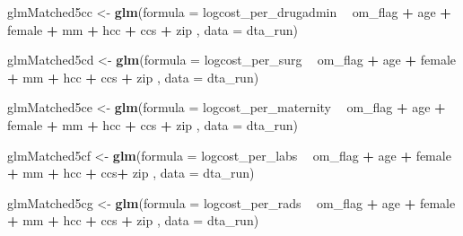 \documentclass[]{article}
\newenvironment{Shaded}{\begin{snugshade}}{\end{snugshade}}
\newcommand{\KeywordTok}[1]{\textcolor[rgb]{0.13,0.29,0.53}{\textbf{#1}}}
\newcommand{\DataTypeTok}[1]{\textcolor[rgb]{0.13,0.29,0.53}{#1}}
\newcommand{\StringTok}[1]{\textcolor[rgb]{0.31,0.60,0.02}{#1}}
\newcommand{\OperatorTok}[1]{\textcolor[rgb]{0.81,0.36,0.00}{\textbf{#1}}}
\newcommand{\NormalTok}[1]{#1}
\begin{document}
\begin{Shaded}
\begin{Highlighting}[]
\NormalTok{glmMatched5cc <-}\StringTok{ }\KeywordTok{glm}\NormalTok{(}\DataTypeTok{formula =}\NormalTok{ logcost_per_drugadmin }\OperatorTok{~}\StringTok{ }\NormalTok{om_flag }\OperatorTok{+}\StringTok{ }\NormalTok{age }\OperatorTok{+}\StringTok{ }\NormalTok{female }\OperatorTok{+}\StringTok{ }\NormalTok{mm }\OperatorTok{+}\StringTok{ }\NormalTok{hcc }\OperatorTok{+}\StringTok{ }\NormalTok{ccs }\OperatorTok{+}\StringTok{ }\NormalTok{zip ,}
                    \DataTypeTok{data    =}\NormalTok{ dta_run)}

\NormalTok{glmMatched5cd <-}\StringTok{ }\KeywordTok{glm}\NormalTok{(}\DataTypeTok{formula =}\NormalTok{ logcost_per_surg }\OperatorTok{~}\StringTok{ }\NormalTok{om_flag }\OperatorTok{+}\StringTok{ }\NormalTok{age }\OperatorTok{+}\StringTok{ }\NormalTok{female }\OperatorTok{+}\StringTok{ }\NormalTok{mm }\OperatorTok{+}\StringTok{ }\NormalTok{hcc }\OperatorTok{+}\StringTok{ }\NormalTok{ccs }\OperatorTok{+}\StringTok{ }\NormalTok{zip ,}
                    \DataTypeTok{data    =}\NormalTok{ dta_run)}

\NormalTok{glmMatched5ce <-}\StringTok{ }\KeywordTok{glm}\NormalTok{(}\DataTypeTok{formula =}\NormalTok{ logcost_per_maternity }\OperatorTok{~}\StringTok{ }\NormalTok{om_flag }\OperatorTok{+}\StringTok{ }\NormalTok{age }\OperatorTok{+}\StringTok{ }\NormalTok{female }\OperatorTok{+}\StringTok{ }\NormalTok{mm }\OperatorTok{+}\StringTok{ }\NormalTok{hcc }\OperatorTok{+}\StringTok{ }\NormalTok{ccs }\OperatorTok{+}\StringTok{ }\NormalTok{zip ,}
                    \DataTypeTok{data    =}\NormalTok{ dta_run)}

\NormalTok{glmMatched5cf <-}\StringTok{ }\KeywordTok{glm}\NormalTok{(}\DataTypeTok{formula =}\NormalTok{ logcost_per_labs }\OperatorTok{~}\StringTok{ }\NormalTok{om_flag }\OperatorTok{+}\StringTok{ }\NormalTok{age }\OperatorTok{+}\StringTok{ }\NormalTok{female }\OperatorTok{+}\StringTok{ }\NormalTok{mm }\OperatorTok{+}\StringTok{ }\NormalTok{hcc }\OperatorTok{+}\StringTok{ }\NormalTok{ccs}\OperatorTok{+}\StringTok{ }\NormalTok{zip  ,}
                    \DataTypeTok{data    =}\NormalTok{ dta_run)}

\NormalTok{glmMatched5cg <-}\StringTok{ }\KeywordTok{glm}\NormalTok{(}\DataTypeTok{formula =}\NormalTok{ logcost_per_rads }\OperatorTok{~}\StringTok{ }\NormalTok{om_flag }\OperatorTok{+}\StringTok{ }\NormalTok{age }\OperatorTok{+}\StringTok{ }\NormalTok{female }\OperatorTok{+}\StringTok{ }\NormalTok{mm }\OperatorTok{+}\StringTok{ }\NormalTok{hcc }\OperatorTok{+}\StringTok{ }\NormalTok{ccs }\OperatorTok{+}\StringTok{ }\NormalTok{zip ,}
                    \DataTypeTok{data    =}\NormalTok{ dta_run)}
\end{Highlighting}
\end{Shaded}
\end{document}
